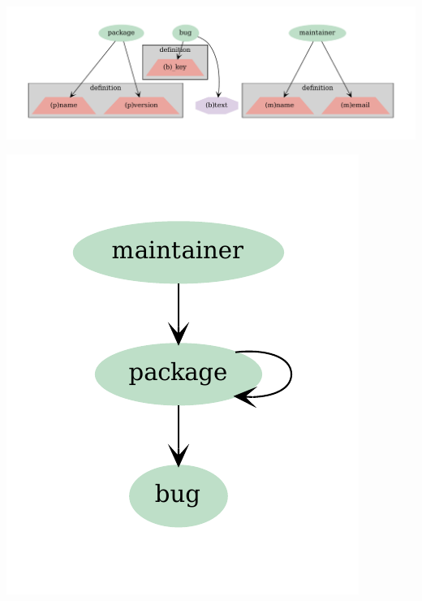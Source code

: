 \documentclass[10pt,oneside,a4paper, twocolumn]{article}
\begin{document}
    \begin{strip}
        \centering
        \begin{minipage}[t]{0.75\textwidth}
            \centering
            \includegraphics[width=\textwidth]{../figs/debian-eco-vc2fields}
        \end{minipage}%
        \hfill
        \begin{minipage}[t]{0.23\textwidth}
            \centering
            \includegraphics[width=\textwidth]{../figs/debian-eco-vc2vc}
        \end{minipage}

        \label{fig:schema}
    \end{strip}
\end{document}
